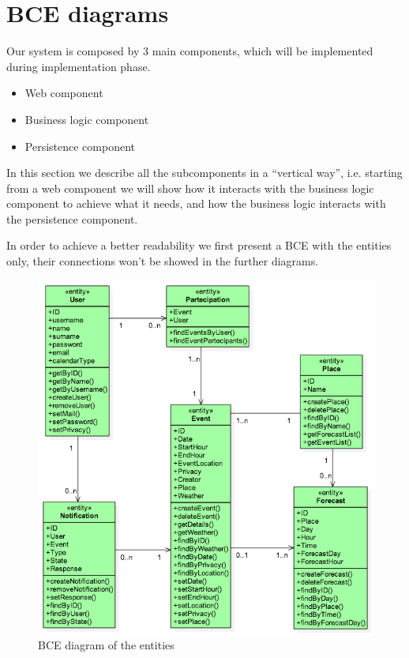 \documentclass[10pt,a4paper,titlepage]{article}
\begin{document}
\clearpage
\section{BCE diagrams}
Our system is composed by 3 main components, which will be implemented during implementation phase.
\begin{itemize}
\item Web component
\item Business logic component
\item Persistence component
\end{itemize}
In this section we describe all the subcomponents in a ``vertical way'', i.e. starting from a web component we will show how it interacts with the business logic component to achieve what it needs, and how the business logic interacts with the persistence component.

\vspace{1em}
In order to achieve a better readability we first present a BCE with the entities only, their connections won't be showed in the further diagrams.
\begin{figure}[h!]
\centering
\includegraphics[width=\linewidth]{./bce/entities_bce}
\caption[Entities BCE]{BCE diagram of the entities}
\label{fig:entities_bce}
\end{figure}
 
\end{document}
